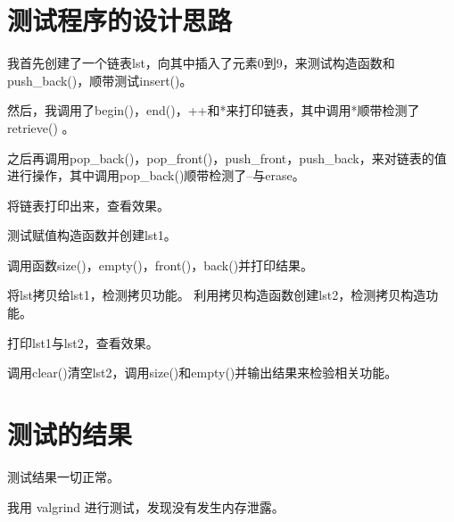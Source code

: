 \documentclass[UTF8]{ctexart}
\begin{document}
\pagestyle{fancy}
\fancyhead{}

\section{测试程序的设计思路}

我首先创建了一个链表lst，向其中插入了元素0到9，来测试构造函数和push\_back()，顺带测试insert()。

然后，我调用了begin()，end()，++和*来打印链表，其中调用*顺带检测了retrieve() 。

之后再调用pop\_back()，pop\_front()，push\_front，push\_back，来对链表的值进行操作，其中调用pop\_back()顺带检测了--与erase。

将链表打印出来，查看效果。

测试赋值构造函数并创建lst1。

调用函数size()，empty()，front()，back()并打印结果。

将lst拷贝给lst1，检测拷贝功能。
利用拷贝构造函数创建lst2，检测拷贝构造功能。

打印lst1与lst2，查看效果。

调用clear()清空lst2，调用size()和empty()并输出结果来检验相关功能。

\section{测试的结果}

测试结果一切正常。

我用 valgrind 进行测试，发现没有发生内存泄露。
\end{document}

